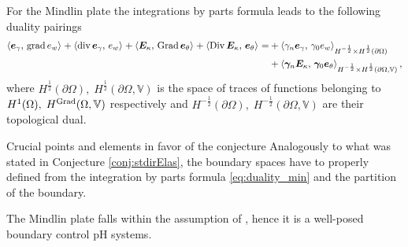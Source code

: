 \begin{remark}\label{rmk:duality_min}
	For the Mindlin plate the integrations by parts formula leads to the following duality pairings 
	\begin{equation}\label{eq:duality_min}
	\begin{aligned}
	\inner{\bm{e}_\gamma}{\grad {e}_w} + \inner{\div \bm{e}_\gamma}{e_w} +  \inner{\bm{E}_\kappa}{\Grad \bm{e}_\theta} + \inner{\Div \bm{E}_\kappa}{\bm{e}_\theta} = &+\inner[H^{-\frac{1}{2}} \times H^{\frac{1}{2}}(\partial\Omega)]{\gamma_{n}\bm{e}_\gamma}{\gamma_{0} {e}_w} \\
	&+\inner[H^{-\frac{1}{2}} \times H^{\frac{1}{2}}(\partial\Omega, \mathbb{V})]{\bm\gamma_{n}\bm{E}_\kappa}{\bm\gamma_{0} \bm{e}_\theta}, \\
	\end{aligned}
	\end{equation}
	where $H^{\frac{1}{2}}(\partial\Omega), \; H^{\frac{1}{2}}(\partial\Omega, \mathbb{V})$ is the space of traces of functions belonging to $H^{1}(\Omega), \; H^{\Grad}(\Omega, \mathbb{V})$ respectively and $H^{-\frac{1}{2}}(\partial\Omega), \; H^{-\frac{1}{2}}(\partial\Omega, \mathbb{V})$ are their topological dual.
\end{remark}


\begin{paragraph}{Crucial points and elements in favor of the conjecture}
	Analogously to what was stated in Conjecture \ref{conj:stdirElas}, the boundary spaces have to properly defined from the integration by parts formula \eqref{eq:duality_min} and the partition of the boundary.
\end{paragraph}

The Mindlin plate falls within the assumption of \cite{skrepek2019wellposedness}, hence it is a well-posed boundary control pH systems.
	

